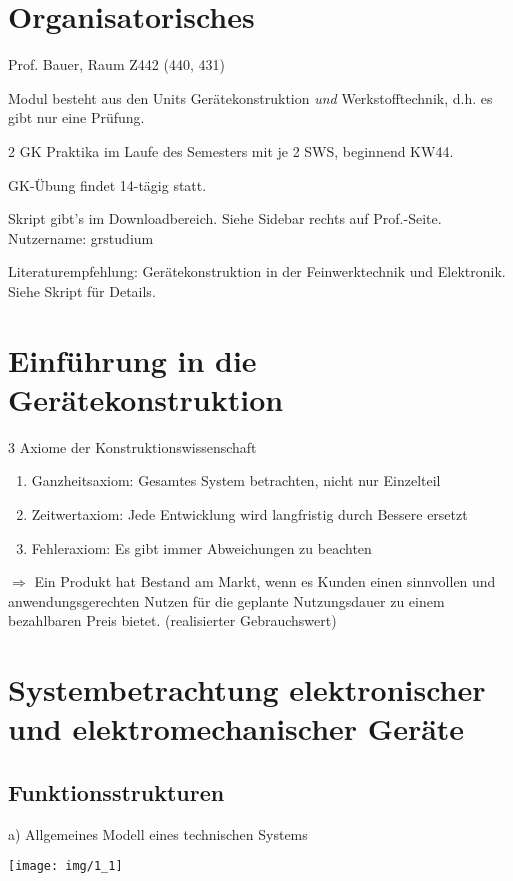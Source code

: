 \section{Organisatorisches}
Prof. Bauer, Raum Z442 (440, 431)

Modul besteht aus den Units Gerätekonstruktion \emph{und} Werkstofftechnik, d.h. es gibt nur eine Prüfung.

2 GK Praktika im Laufe des Semesters mit je 2 SWS, beginnend KW44.

GK-Übung findet 14-tägig statt.

Skript gibt's im Downloadbereich. Siehe Sidebar rechts auf Prof.-Seite. \\Nutzername: grstudium

Literaturempfehlung: Gerätekonstruktion in der Feinwerktechnik und Elektronik. Siehe Skript für Details.

\section{Einführung in die Gerätekonstruktion}

3 Axiome der Konstruktionswissenschaft

\begin{enumerate}
	\item Ganzheitsaxiom:
		Gesamtes System betrachten, nicht nur Einzelteil
	\item Zeitwertaxiom:
		Jede Entwicklung wird langfristig durch Bessere ersetzt
	\item Fehleraxiom:
		Es gibt immer Abweichungen zu beachten
\end{enumerate}

$\Rightarrow$ Ein Produkt hat Bestand am Markt, wenn es Kunden einen sinnvollen und anwendungsgerechten Nutzen für die geplante Nutzungsdauer zu einem bezahlbaren Preis bietet. (realisierter Gebrauchswert)

\section{Systembetrachtung elektronischer und elektromechanischer Geräte}
\subsection{Funktionsstrukturen}

a) Allgemeines Modell eines technischen Systems

\begin{center}
	\texttt{[image: img/1\_1]}
\end{center}
